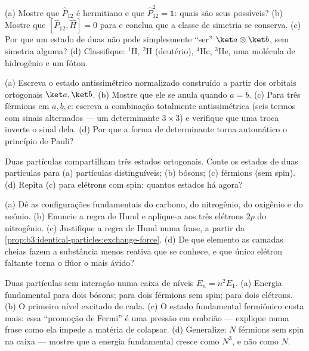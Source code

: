 \begin{exercise}[$\star$]\label{exo:b3:identical-particles:1}
(a) Mostre que $\hat P_{12}$ é hermitiano e que $\hat P_{12}^2 = \mathbb 1$:
quais são seus  possíveis? (b) Mostre que $[\hat P_{12}, \hat H] =
0$ para  e conclua que a classe de simetria se
conserva. (c) Por que um estado de duas
 não pode simplesmente ``ser''
$\ket a\otimes\ket b$, sem simetria alguma? (d) Classifique:
$^1$H, $^2$H (deutério), $^4$He, $^3$He, uma molécula de hidrogênio e
um fóton.
\end{exercise}

\begin{exercise}[$\star$]\label{exo:b3:identical-particles:2}
(a) Escreva o estado antissimétrico normalizado construído a partir dos
orbitais ortogonais $\ket a, \ket b$. (b) Mostre que ele se anula
quando $a = b$. (c) Para três férmions em $a, b, c$: escreva a
combinação totalmente antissimétrica (seis termos com sinais
alternados --- um determinante $3\times3$) e verifique que uma troca
inverte o sinal dela. (d) Por que a forma de determinante torna
automático o princípio de Pauli?
\end{exercise}

\begin{exercise}[$\star$]\label{exo:b3:identical-particles:3}
Duas partículas compartilham três estados ortogonais. Conte os estados
de duas partículas para (a) partículas distinguíveis; (b) bósons; (c)
férmions (sem spin). (d) Repita (c) para elétrons com spin: quantos
estados há agora?
\end{exercise}

\begin{exercise}[$\star$]\label{exo:b3:identical-particles:4}
(a) Dê as configurações fundamentais do carbono, do nitrogênio, do
oxigênio e do neônio. (b) Enuncie a regra de Hund e aplique-a aos três
elétrons $2p$ do nitrogênio. (c) Justifique a regra de Hund numa frase,
a partir da \cref{prop:b3:identical-particles:exchange-force}. (d) De
que elemento as camadas cheias fazem a substância menos reativa que se
conhece, e que único elétron faltante torna o flúor o mais ávido?
\end{exercise}

\begin{exercise}[$\star\star$]\label{exo:b3:identical-particles:5}
Duas partículas sem interação numa caixa de níveis $E_n = n^2E_1$.
(a) Energia fundamental para dois bósons; para dois férmions sem spin;
para dois elétrons. (b) O primeiro nível excitado de cada. (c) O estado
fundamental fermiônico custa mais: essa ``promoção de Fermi'' é uma
pressão em embrião --- explique numa frase como ela impede a matéria de
colapsar. (d) Generalize: $N$ férmions sem spin na caixa --- mostre que
a energia fundamental cresce como $N^3$, e não como $N$.
\end{exercise}

